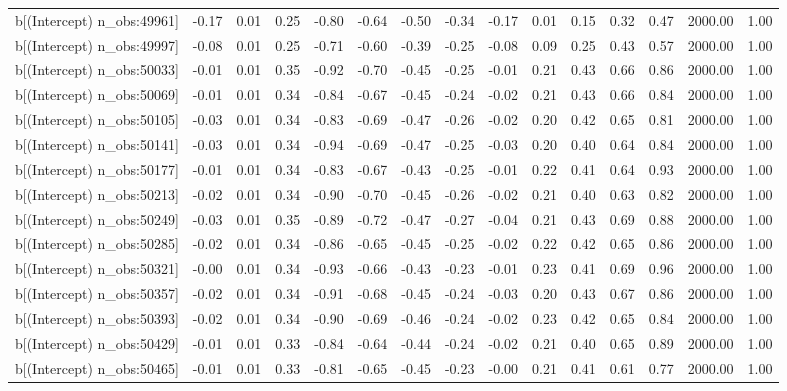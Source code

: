 \begin{table}[ht]
\begin{tabular}{rrrrrrrrrrrrrrr}
  b[(Intercept) n\_obs:49961] & -0.17 & 0.01 & 0.25 & -0.80 & -0.64 & -0.50 & -0.34 & -0.17 & 0.01 & 0.15 & 0.32 & 0.47 & 2000.00 & 1.00 \\ 
  b[(Intercept) n\_obs:49997] & -0.08 & 0.01 & 0.25 & -0.71 & -0.60 & -0.39 & -0.25 & -0.08 & 0.09 & 0.25 & 0.43 & 0.57 & 2000.00 & 1.00 \\ 
  b[(Intercept) n\_obs:50033] & -0.01 & 0.01 & 0.35 & -0.92 & -0.70 & -0.45 & -0.25 & -0.01 & 0.21 & 0.43 & 0.66 & 0.86 & 2000.00 & 1.00 \\ 
  b[(Intercept) n\_obs:50069] & -0.01 & 0.01 & 0.34 & -0.84 & -0.67 & -0.45 & -0.24 & -0.02 & 0.21 & 0.43 & 0.66 & 0.84 & 2000.00 & 1.00 \\ 
  b[(Intercept) n\_obs:50105] & -0.03 & 0.01 & 0.34 & -0.83 & -0.69 & -0.47 & -0.26 & -0.02 & 0.20 & 0.42 & 0.65 & 0.81 & 2000.00 & 1.00 \\ 
  b[(Intercept) n\_obs:50141] & -0.03 & 0.01 & 0.34 & -0.94 & -0.69 & -0.47 & -0.25 & -0.03 & 0.20 & 0.40 & 0.64 & 0.84 & 2000.00 & 1.00 \\ 
  b[(Intercept) n\_obs:50177] & -0.01 & 0.01 & 0.34 & -0.83 & -0.67 & -0.43 & -0.25 & -0.01 & 0.22 & 0.41 & 0.64 & 0.93 & 2000.00 & 1.00 \\ 
  b[(Intercept) n\_obs:50213] & -0.02 & 0.01 & 0.34 & -0.90 & -0.70 & -0.45 & -0.26 & -0.02 & 0.21 & 0.40 & 0.63 & 0.82 & 2000.00 & 1.00 \\ 
  b[(Intercept) n\_obs:50249] & -0.03 & 0.01 & 0.35 & -0.89 & -0.72 & -0.47 & -0.27 & -0.04 & 0.21 & 0.43 & 0.69 & 0.88 & 2000.00 & 1.00 \\ 
  b[(Intercept) n\_obs:50285] & -0.02 & 0.01 & 0.34 & -0.86 & -0.65 & -0.45 & -0.25 & -0.02 & 0.22 & 0.42 & 0.65 & 0.86 & 2000.00 & 1.00 \\ 
  b[(Intercept) n\_obs:50321] & -0.00 & 0.01 & 0.34 & -0.93 & -0.66 & -0.43 & -0.23 & -0.01 & 0.23 & 0.41 & 0.69 & 0.96 & 2000.00 & 1.00 \\ 
  b[(Intercept) n\_obs:50357] & -0.02 & 0.01 & 0.34 & -0.91 & -0.68 & -0.45 & -0.24 & -0.03 & 0.20 & 0.43 & 0.67 & 0.86 & 2000.00 & 1.00 \\ 
  b[(Intercept) n\_obs:50393] & -0.02 & 0.01 & 0.34 & -0.90 & -0.69 & -0.46 & -0.24 & -0.02 & 0.23 & 0.42 & 0.65 & 0.84 & 2000.00 & 1.00 \\ 
  b[(Intercept) n\_obs:50429] & -0.01 & 0.01 & 0.33 & -0.84 & -0.64 & -0.44 & -0.24 & -0.02 & 0.21 & 0.40 & 0.65 & 0.89 & 2000.00 & 1.00 \\ 
  b[(Intercept) n\_obs:50465] & -0.01 & 0.01 & 0.33 & -0.81 & -0.65 & -0.45 & -0.23 & -0.00 & 0.21 & 0.41 & 0.61 & 0.77 & 2000.00 & 1.00 \\ 

\end{tabular}
\end{table}
